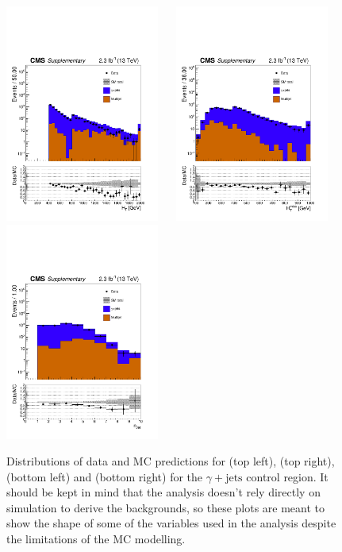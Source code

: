 \clearpage
\begin{figure}[tbhp]
    \caption{ 
    Distributions of data and MC predictions for \scalht (top left), \mht (top right), \nj (bottom left) and \nb (bottom right) 
    for the $\gamma+\mathrm{jets}$ control region. 
    It should be kept in mind that the analysis doesn't rely directly on simulation to derive the backgrounds, 
    so these plots are meant to show the shape of some of the variables used in the analysis despite the limitations 
    of the MC modelling. 
    \label{fig:data-MC_plots_SinglePhoton} }
  \begin{center}
     \includegraphics[width=0.45\textwidth]{figures/SinglePhoton_ht40_all_all} ~~
     \includegraphics[width=0.45\textwidth]{figures/SinglePhoton_mht40_pt_all_all} \\
     \includegraphics[width=0.45\textwidth]{figures/SinglePhoton_nJet40_all_all} ~~

\end{center}
\end{figure}
